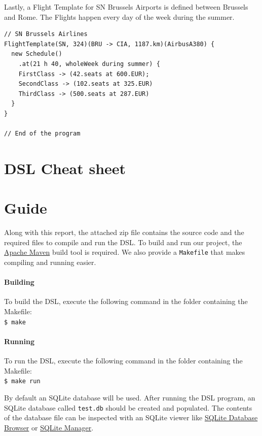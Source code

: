 \documentclass[a4paper]{article}
\newcommand{\cc}[1]{\texttt{#1}}
\begin{document}
Lastly, a Flight Template for SN Brussels Airports is defined between Brussels and Rome.
The Flights happen every day of the week during the summer.

\begin{lstlisting}
// SN Brussels Airlines
FlightTemplate(SN, 324)(BRU -> CIA, 1187.km)(AirbusA380) {
  new Schedule()
    .at(21 h 40, wholeWeek during summer) {
    FirstClass -> (42.seats at 600.EUR);
    SecondClass -> (102.seats at 325.EUR)
    ThirdClass -> (500.seats at 287.EUR)
  }
}

// End of the program
\end{lstlisting}

\section{DSL Cheat sheet}
\label{sec: cheat-sheet}




\clearpage
\section{Guide}
\label{sec:guide}


Along with this report, the attached zip file contains the source code and the required files to compile and run the DSL\@.
To build and run our project, the \href{http://maven.apache.org/}{Apache Maven} build tool is required.
We also provide a \cc{Makefile} that makes compiling and running easier.

\paragraph{Building}
To build the DSL, execute the following command in the folder containing the Makefile:\\
\cc{\$ make}

\paragraph{Running}
To run the DSL, execute the following command in the folder containing the Makefile:\\
\cc{\$ make run}

By default an SQLite database will be used.
After running the DSL program, an SQLite database called \cc{test.db} should be created and populated.
The contents of the database file can be inspected with an SQLite viewer like \href{http://sourceforge.net/projects/sqlitebrowser/}{SQLite Database Browser} or \href{https://addons.mozilla.org/en-us/firefox/addon/sqlite-manager/}{SQLite Manager}.
\end{document}
